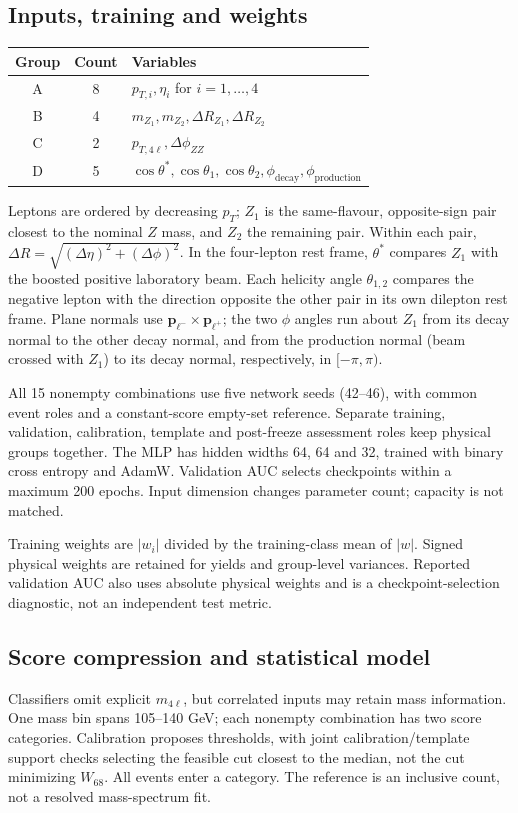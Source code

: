 \documentclass[11pt,a4paper]{article}
\newcommand{\mfl}{m_{4\ell}}
\newcommand{\W}{W_{68}}
\begin{document}
\subsection*{Inputs, training and weights}
\begin{center}
\begin{tabular}{ccl}
\toprule
Group & Count & Variables\\
\midrule
A & 8 & $p_{T,i},\eta_i$ for $i=1,\ldots,4$\\
B & 4 & $m_{Z_1},m_{Z_2},\Delta R_{Z_1},\Delta R_{Z_2}$\\
C & 2 & $p_{T,4\ell},\Delta\phi_{ZZ}$\\
D & 5 & $\cos\theta^*,\cos\theta_1,\cos\theta_2,
              \phi_{\mathrm{decay}},\phi_{\mathrm{production}}$\\
\bottomrule
\end{tabular}
\end{center}
Leptons are ordered by decreasing $p_T$; $Z_1$ is the same-flavour,
opposite-sign pair closest to the nominal $Z$ mass, and $Z_2$ the remaining
pair. Within each pair, $\Delta R=\sqrt{(\Delta\eta)^2+(\Delta\phi)^2}$.
In the four-lepton rest frame, $\theta^*$ compares $Z_1$ with the boosted
positive laboratory beam. Each helicity angle $\theta_{1,2}$ compares the
negative lepton with the direction opposite the other pair in its own
dilepton rest frame. Plane normals use $\mathbf{p}_{\ell^-}
\times\mathbf{p}_{\ell^+}$; the two $\phi$ angles run about $Z_1$ from
its decay normal to the other decay normal, and from the production normal
(beam crossed with $Z_1$) to its decay normal, respectively, in $[-\pi,\pi)$.

All 15 nonempty combinations use five network seeds (42--46), with common
event roles and a constant-score empty-set reference. Separate training,
validation, calibration, template and post-freeze assessment roles keep physical
groups together. The MLP has hidden widths 64, 64 and 32, trained with binary
cross entropy and AdamW. Validation AUC selects checkpoints within a maximum
200 epochs. Input dimension changes parameter count; capacity is not matched.

Training weights are $|w_i|$ divided by the training-class mean of $|w|$.
Signed physical weights are retained for yields and group-level variances.
Reported validation AUC also uses absolute physical weights and is a
checkpoint-selection diagnostic, not an independent test metric.

\subsection*{Score compression and statistical model}
Classifiers omit explicit $\mfl$, but correlated inputs may retain mass
information. One mass bin spans 105--140 GeV; each nonempty combination
has two score categories. Calibration proposes thresholds, with joint
calibration/template support checks selecting the feasible cut closest to
the median, not the cut minimizing $\W$. All events enter a category.
The reference is an inclusive count, not a resolved mass-spectrum fit.
\end{document}
